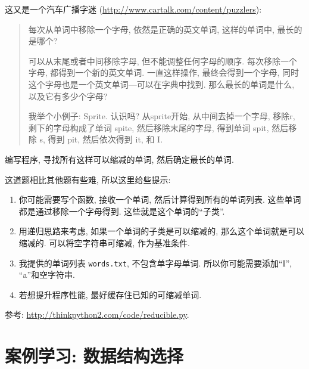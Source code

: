 \documentclass[10pt]{book}
\begin{document}
\begin{exercise}

这又是一个汽车广播字迷
(\url{http://www.cartalk.com/content/puzzlers}):

\begin{quote}
每次从单词中移除一个字母, 依然是正确的英文单词, 这样的单词中, 
最长的是哪个?

可以从末尾或者中间移除字母, 但不能调整任何字母的顺序. 
每次移除一个字母, 都得到一个新的英文单词. 一直这样操作, 
最终会得到一个字母, 同时这个字母也是一个英文单词---可以在字典中找到. 
那么最长的单词是什么, 以及它有多少个字母?

我举个小例子: Sprite. 认识吗? 从sprite开始, 从中间去掉一个字母, 移除r, 剩下的字母构成了单词 spite, 
然后移除末尾的字母, 得到单词 spit, 然后移除 s, 得到 pit, 然后依次得到 it, 和 I. 
\end{quote}

编写程序, 寻找所有这样可以缩减的单词, 然后确定最长的单词. 

这道题相比其他题有些难, 所以这里给些提示:

\begin{enumerate}

\item 你可能需要写个函数, 接收一个单词, 然后计算得到所有的单词列表. 
这些单词都是通过移除一个字母得到. 这些就是这个单词的``子类''.

\item 用递归思路来考虑, 如果一个单词的子类是可以缩减的, 
那么这个单词就是可以缩减的. 可以将空字符串可缩减, 作为基准条件. 

\item 我提供的单词列表 {\tt words.txt}, 不包含单字母单词. 所以你可能需要添加``I'', ``a''和空字符串. 

\item 若想提升程序性能, 最好缓存住已知的可缩减单词. 

\end{enumerate}

参考: \url{http://thinkpython2.com/code/reducible.py}.

\end{exercise}




\chapter{案例学习: 数据结构选择}
\end{document}
